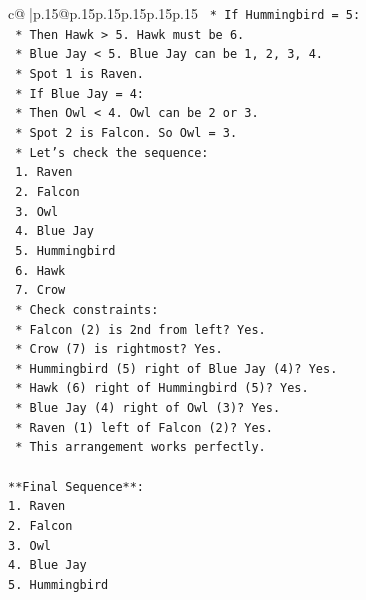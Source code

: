 \documentclass{article}
\begin{document}
{\begin{supertabular}{c@{$\;$}|p{.15\linewidth}@{}p{.15\linewidth}p{.15\linewidth}p{.15\linewidth}p{.15\linewidth}p{.15\linewidth}}
{{{\texttt{        *   If Hummingbird = 5:} \\
\texttt{            *   Then Hawk > 5. Hawk must be 6.} \\
\texttt{            *   Blue Jay < 5. Blue Jay can be 1, 2, 3, 4.} \\
\texttt{            *   Spot 1 is Raven.} \\
\texttt{            *   If Blue Jay = 4:} \\
\texttt{                *   Then Owl < 4. Owl can be 2 or 3.} \\
\texttt{                *   Spot 2 is Falcon. So Owl = 3.} \\
\texttt{                *   Let's check the sequence:} \\
\texttt{                    1. Raven} \\
\texttt{                    2. Falcon} \\
\texttt{                    3. Owl} \\
\texttt{                    4. Blue Jay} \\
\texttt{                    5. Hummingbird} \\
\texttt{                    6. Hawk} \\
\texttt{                    7. Crow} \\
\texttt{                *   Check constraints:} \\
\texttt{                    *   Falcon (2) is 2nd from left? Yes.} \\
\texttt{                    *   Crow (7) is rightmost? Yes.} \\
\texttt{                    *   Hummingbird (5) right of Blue Jay (4)? Yes.} \\
\texttt{                    *   Hawk (6) right of Hummingbird (5)? Yes.} \\
\texttt{                    *   Blue Jay (4) right of Owl (3)? Yes.} \\
\texttt{                    *   Raven (1) left of Falcon (2)? Yes.} \\
\texttt{    *   This arrangement works perfectly.} \\
\\ 
\texttt{**Final Sequence**:} \\
\texttt{1. Raven} \\
\texttt{2. Falcon} \\
\texttt{3. Owl} \\
\texttt{4. Blue Jay} \\
\texttt{5. Hummingbird} \\
}}}
\end{supertabular}}
\end{document}
